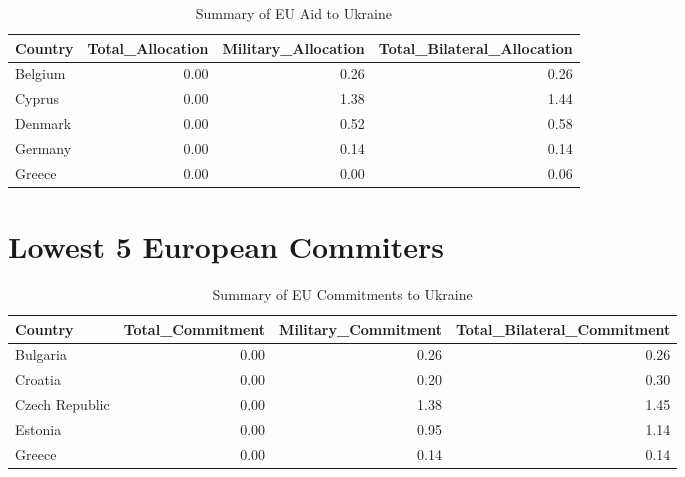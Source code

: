 \documentclass[12pt,preprint, authoryear]{elsarticle}
\numberwithin{equation}{section}
\numberwithin{figure}{section}
\numberwithin{table}{section}
\begin{document}
\begingroup\fontsize{12pt}{13pt}\selectfont
\begin{longtable}{lrrr}
\caption{Summary of EU Aid to Ukraine \label{tab1}} \\ 
  \toprule
Country & Total\_Allocation & Military\_Allocation & Total\_Bilateral\_Allocation \\ 
  \midrule
Belgium & 0.00 & 0.26 & 0.26 \\ 
  Cyprus & 0.00 & 1.38 & 1.44 \\ 
  Denmark & 0.00 & 0.52 & 0.58 \\ 
  Germany & 0.00 & 0.14 & 0.14 \\ 
  Greece & 0.00 & 0.00 & 0.06 \\ 
   \bottomrule
\end{longtable}
\endgroup

\hypertarget{lowest-5-european-commiters}{%
\section{Lowest 5 European
Commiters}\label{lowest-5-european-commiters}}

\begingroup\fontsize{11pt}{12pt}\selectfont
\begin{longtable}{lrrr}
\caption{Summary of EU Commitments to Ukraine \label{tab2}} \\ 
  \toprule
Country & Total\_Commitment & Military\_Commitment & Total\_Bilateral\_Commitment \\ 
  \midrule
Bulgaria & 0.00 & 0.26 & 0.26 \\ 
  Croatia & 0.00 & 0.20 & 0.30 \\ 
  Czech Republic & 0.00 & 1.38 & 1.45 \\ 
  Estonia & 0.00 & 0.95 & 1.14 \\ 
  Greece & 0.00 & 0.14 & 0.14 \\ 
   \bottomrule
\end{longtable}
\endgroup
\end{document}
